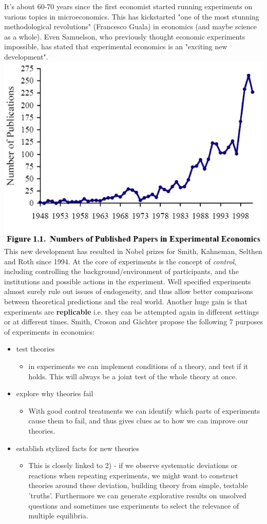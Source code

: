 \documentclass[12pt, a4paper]{article}
\begin{document}
\begin{multicols}{2}
It's about 60-70 years since the first economist started running experiments on various topics in microeconomics. This has kickstarted "one of the most stunning methodological revolutions" (Francesco Guala) in economics (and maybe science as a whole). Even Samuelson, who previously thought economic experiments impossible, has stated that experimental economics is an "exciting new development". 
\includegraphics[width = 0.5 \textwidth]{Lecture_14_Experiments.jpg}
This new development has resulted in Nobel prizes for Smith, Kahneman, Selthen and Roth since 1994. At the core of experiments is the concept of \textit{control}, including controlling the background/environment of participants, and the institutions and possible actions in the experiment. Well specified experiments almost surely rule out issues of endogeneity, and thus allow better comparisons between theoretical predictions and the real world. Another huge gain is that experiments are \textbf{replicable} i.e. they can be attempted again in different settings or at different times. Smith, Croson and Gächter propose the following 7 purposes of experiments in economics:
\begin{itemize}
\item[1)] test theories
\begin{itemize}
\item in experiments we can implement conditions of a theory, and test if it holds. This will always be a joint test of the whole theory at once.
\end{itemize}
\item[2)] explore why theories fail
\begin{itemize}
\item With good control treatments we can identify which parts of experiments cause them to fail, and thus gives clues as to how we can improve our theories.
\end{itemize}
\item[3)] establish stylized facts for new theories
\begin{itemize}
\item This is closely linked to 2) - if we observe systematic deviations or reactions when repeating experiments, we might want to construct theories around these deviation, building theory from simple, testable 'truths'. Furthermore we can generate explorative results on unsolved questions and sometimes use experiments to select the relevance of multiple equilibria.

\end{itemize}
\end{itemize}
\end{multicols}
\end{document}

